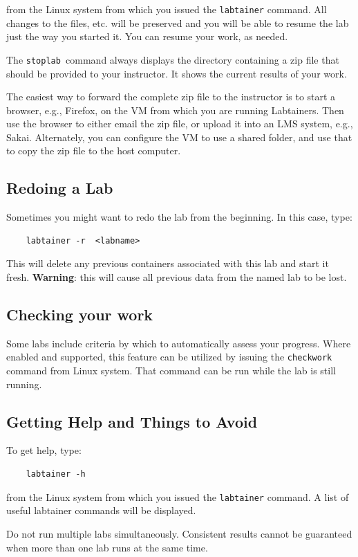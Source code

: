 \documentclass[12pt]{article}
\begin{document}
\noindent from the Linux system from which you issued the {\tt labtainer} command. All changes to the files, etc. will be preserved and you will be able to resume the lab just the way you started it. You can resume your work, as needed.

The {\tt stoplab }command always displays the directory containing a zip file that should be provided to your instructor. It shows the current results of your work. 

The easiest way to forward the complete zip file to the instructor is to start a browser, e.g., Firefox, on the VM from which you
are running Labtainers.  Then use the browser to either email the zip file, or upload it into an LMS system, e.g., Sakai.
Alternately, you can configure the VM to use a shared folder, and use that to copy the zip file to the host computer.

\subsection{Redoing a Lab}
Sometimes you might want to redo the lab from the beginning.  In this case, type:
\begin{verbatim}
    labtainer -r  <labname>
\end{verbatim}
This will delete any previous containers associated with this lab and start it fresh.  \textbf{Warning}: this will cause all previous data from the named lab to be lost.

\subsection{Checking your work}
Some labs include criteria by which to automatically assess your progress.
Where enabled and supported, this feature can be utilized by issuing the {\tt checkwork} command from Linux system.
That command can be run while the lab is still running.

\subsection{Getting Help and Things to Avoid}
To get help, type:
\begin{verbatim}
    labtainer -h
\end{verbatim}
\noindent from the Linux system from which you issued the {\tt labtainer} command. A list of useful labtainer commands will be displayed.

Do not run multiple labs simultaneously.  Consistent results cannot be guaranteed when more than one lab runs at the same time.
\end{document}
